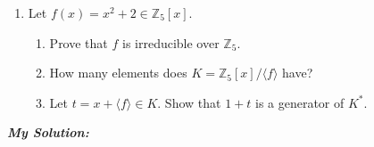 \documentclass[11pt]{article}
\begin{document}
\newpage

\normalsize

\begin{enumerate}[label={1.}, left=0pt]
  \item Let $f(x)=x^{2}+2\in\mathbb{Z}_{5}[x]$.
  \begin{enumerate}[label={(\alph*)}, left=0pt]
    \item {} Prove that $f$ is irreducible over $\mathbb{Z}_{5}$.
    \item {} How many elements does $K=\mathbb{Z}_{5}[x]/\langle f\rangle$ have?
    \item {} Let $t=x+\langle f\rangle\in K$. Show that $1+t$ is a generator of $K^{*}$. 
  \end{enumerate}
\end{enumerate}
\textit{\textbf{My Solution:}}
\end{document}
